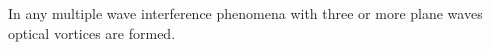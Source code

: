 In any multiple wave interference phenomena with three or more plane
waves optical vortices are formed.


